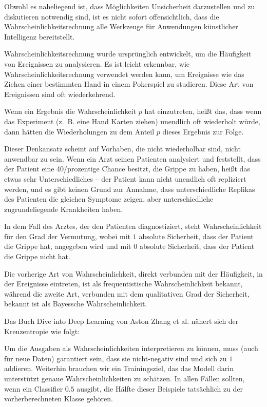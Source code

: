 Obwohl es naheliegend ist, dass Möglichkeiten Unsicherheit darzustellen und zu diskutieren notwendig sind, ist es nicht sofort offensichtlich, dass die Wahrscheinlichkeitsrechnung alle Werkzeuge für Anwendungen künstlicher Intelligenz bereitstellt.

Wahrscheinlichkeitsrechnung wurde ursprünglich entwickelt, um die Häufigkeit von Ereignissen zu analysieren. Es ist leicht erkennbar, wie Wahrscheinlichkeitsrechnung verwendet werden kann, um Ereignisse wie das Ziehen einer bestimmten Hand in einem Pokerspiel zu studieren. Diese Art von Ereignissen sind oft wiederkehrend.

Wenn ein Ergebnis die Wahrscheinlichkeit $p$ hat einzutreten, heißt das, dass wenn das Experiment (z.~B. eine Hand Karten ziehen) unendlich oft wiederholt würde, dann hätten die Wiederholungen zu dem Anteil $p$ dieses Ergebnis zur Folge.

Dieser Denkansatz scheint auf Vorhaben, die nicht wiederholbar sind, nicht anwendbar zu sein. Wenn ein Arzt seinen Patienten analysiert und feststellt, dass der Patient eine 40\=/prozentige Chance besitzt, die Grippe zu haben, heißt das etwas sehr Unterschiedliches -- der Patient kann nicht unendlich oft repliziert werden, und es gibt keinen Grund zur Annahme, dass unterschiedliche Replikas des Patienten die gleichen Symptome zeigen, aber unterschiedliche zugrundeliegende Krankheiten haben.

In dem Fall des Arztes, der den Patienten diagnostiziert, steht Wahrscheinlichkeit für den Grad der Vermutung, wobei mit $1$ absolute Sicherheit, dass der Patient die Grippe hat, angegeben wird und mit $0$ absolute Sicherheit, dass der Patient die Grippe nicht hat.

Die vorherige Art von Wahrscheinlichkeit, direkt verbunden mit der Häufigkeit, in der Ereignisse eintreten, ist als frequentistische Wahrscheinlichkeit bekannt, während die zweite Art, verbunden mit dem qualitativen Grad der Sicherheit, bekannt ist als Bayessche Wahrscheinlichkeit.
\cite{goodfellow2016deeplearning}

Das Buch Dive into Deep Learning von Aston Zhang et al. \cite{zhang2020dive} nähert sich der Kreuzentropie wie folgt:

Um die Ausgaben als Wahrscheinlichkeiten interpretieren zu können, muss (auch für neue Daten) garantiert sein, dass sie nicht-negativ sind und sich zu $1$ addieren. Weiterhin brauchen wir ein Trainingsziel, das das Modell darin unterstützt genaue Wahrscheinlichkeiten zu schätzen. In allen Fällen sollten, wenn ein Classifier $0.5$ ausgibt, die Hälfte dieser Beispiele tatsächlich zu der vorherberechneten Klasse gehören.

